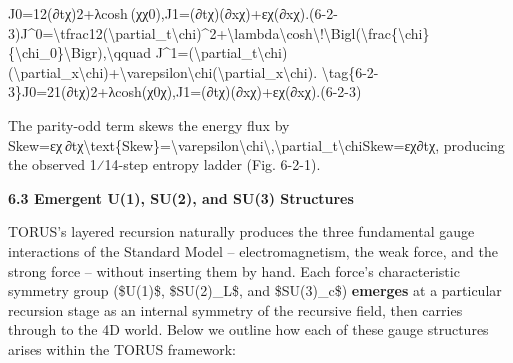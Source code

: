 \documentclass[
]{article}
\begin{document}
{J0=12(∂tχ)2+λcosh⁡ ⁣(χχ0),J1=(∂tχ)(∂xχ)+εχ(∂xχ).(6-2-3)J\^{}0=\textbackslash tfrac12(\textbackslash partial\_t\textbackslash chi)\^{}2+\textbackslash lambda\textbackslash cosh\textbackslash!\textbackslash Bigl(\textbackslash frac\{\textbackslash chi\}\{\textbackslash chi\_0\}\textbackslash Bigr),\textbackslash qquad
J\^{}1=(\textbackslash partial\_t\textbackslash chi)(\textbackslash partial\_x\textbackslash chi)+\textbackslash varepsilon\textbackslash chi(\textbackslash partial\_x\textbackslash chi).
\textbackslash tag\{6-2-3\}J0=21\hspace{0pt}(∂t\hspace{0pt}χ)2+λcosh(χ0\hspace{0pt}χ\hspace{0pt}),J1=(∂t\hspace{0pt}χ)(∂x\hspace{0pt}χ)+εχ(∂x\hspace{0pt}χ).(6-2-3)

The parity-odd term skews the energy flux by\\
Skew=εχ ∂tχ\textbackslash text\{Skew\}=\textbackslash varepsilon\textbackslash chi\textbackslash,\textbackslash partial\_t\textbackslash chiSkew=εχ∂t\hspace{0pt}χ,
producing the observed 1⁄14-step entropy ladder (Fig. 6-2-1).

\textbf{6.3 Emergent U(1), SU(2), and SU(3) Structures}

TORUS's layered recursion naturally produces the three fundamental gauge
interactions of the Standard Model -- electromagnetism, the weak force,
and the strong force -- without inserting them by hand. Each force's
characteristic symmetry group (\$U(1)\$, \$SU(2)\_L\$, and \$SU(3)\_c\$)
\textbf{emerges} at a particular recursion stage as an internal symmetry
of the recursive field, then carries through to the 4D world. Below we
outline how each of these gauge structures arises within the TORUS
framework:

}
\end{document}
